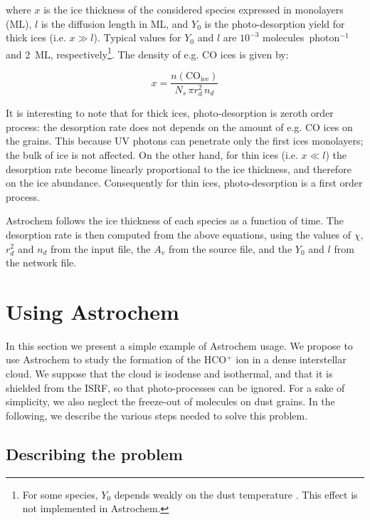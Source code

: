 \documentclass[a4paper,12pt]{article}
\newcommand{\conc}[1]{n(\mathrm{#1})}
\begin{document}
\noindent
where $x$ is the ice thickness of the considered species expressed in
monolayers (ML), $l$ is the diffusion length in ML, and $Y_{0}$ is the
photo-desorption yield for thick ices (i.e. $x \gg l$). Typical values
for $Y_{0}$ and $l$ are $10^{-3}$ molecules~photon$^{-1}$ and 2~ML,
respectively\footnote{For some species, $Y_{0}$ depends weakly on the
  dust temperature \citep{Oberg09a}. This effect is not implemented in
  Astrochem.}. The density of e.g. CO ices is given by:

\begin{equation}
  x = \frac{\conc{CO_{ice}}}{N_{s} \, \pi r_{d}^2 \, n_{d}}
  \label{eq:ice-thickness}
\end{equation}

\noindent
It is interesting to note that for thick ices, photo-desorption is
zeroth order process: the desorption rate does not depends on the
amount of e.g. CO ices on the grains. This because UV photons can
penetrate only the first ices monolayers; the bulk of ice is not
affected. On the other hand, for thin ices (i.e. $x \ll l$) the
desorption rate become linearly proportional to the ice thickness, and
therefore on the ice abundance. Consequently for thin ices,
photo-desorption is a first order process.

Astrochem follows the ice thickness of each species as a function of
time. The desorption rate is then computed from the above equations,
using the values of $\chi$, $r_{d}^2$ and $n_{d}$ from the input file,
the $A_{v}$ from the source file, and the $Y_{0}$ and $l$ from the
network file.

\section{Using Astrochem}
\label{sec:using-astrochem}

In this section we present a simple example of Astrochem usage.  We
propose to use Astrochem to study the formation of the HCO$^{+}$ ion
in a dense interstellar cloud. We suppose that the cloud is isodense
and isothermal, and that it is shielded from the ISRF, so that
photo-processes can be ignored. For a sake of simplicity, we also
neglect the freeze-out of  molecules on dust grains. In the following,
we describe the various steps needed to solve this problem.

\subsection{Describing the problem}
\label{sec:describing-problem}
\end{document}
